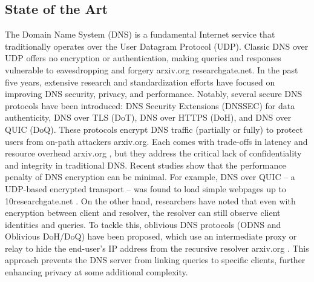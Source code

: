 \subsection{State of the Art}
The Domain Name System (DNS) is a fundamental Internet service that
traditionally operates over the User Datagram Protocol (UDP). Classic DNS over
UDP offers no encryption or authentication, making queries and responses
vulnerable to eavesdropping and forgery arxiv.org researchgate.net. In the past
five years, extensive research and standardization efforts have focused on
improving DNS security, privacy, and performance. Notably, several secure DNS
protocols have been introduced: DNS Security Extensions (DNSSEC) for data
authenticity, DNS over TLS (DoT), DNS over HTTPS (DoH), and DNS over QUIC
(DoQ). These protocols encrypt DNS traffic (partially or fully) to protect
users from on-path attackers arxiv.org. Each comes with trade-offs in latency
and resource overhead arxiv.org , but they address the critical lack of
confidentiality and integrity in traditional DNS. Recent studies show that the
performance penalty of DNS encryption can be minimal. For example, DNS over
QUIC – a UDP-based encrypted transport – was found to load simple webpages up
to 10researchgate.net . On the other hand, researchers have noted that even
with encryption between client and resolver, the resolver can still observe
client identities and queries. To tackle this, oblivious DNS protocols (ODNS
and Oblivious DoH/DoQ) have been proposed, which use an intermediate proxy or
relay to hide the end-user’s IP address from the recursive resolver arxiv.org .
This approach prevents the DNS server from linking queries to specific clients,
further enhancing privacy at some additional complexity.%

